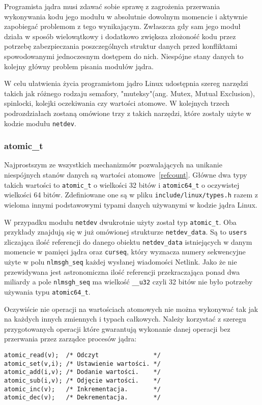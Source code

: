 \documentclass[10pt]{scrartcl}
\begin{document}
Programista jądra musi zdawać sobie sprawę z zagrożenia przerwania wykonywania kodu jego modułu w absolutnie dowolnym momencie i aktywnie zapobiegać problemom z tego wynikającym. Zwłaszcza gdy sam jego moduł działa w sposób wielowątkowy i dodatkowo zwiększa złożoność kodu przez potrzebę zabezpieczania poszczególnych struktur danych przed konfliktami spowodowanymi jednoczesnym dostępem do nich. Niespójne stany danych to kolejny główny problem pisania modułów jądra.

W celu ułatwienia życia programistom jądro Linux udostępnia szereg narzędzi takich jak różnego rodzaju semafory, "muteksy"(ang. Mutex, Mutual Exclusion), spinlocki, kolejki oczekiwania czy wartości atomowe. W kolejnych trzech podrozdziałach zostaną omówione trzy z takich narzędzi, które zostały użyte w kodzie modułu \texttt{netdev}.

\subsubsection{atomic\_t}

Najprostszym ze wszystkich mechanizmów pozwalających na unikanie niespójnych stanów danych są wartości atomowe~\ref{refcount}. Główne dwa typy takich wartości to \texttt{atomic\_t} o wielkości 32 bitów i \texttt{atomic64\_t} o oczywistej wielkości 64 bitów. Zdefiniowane one są w pliku \texttt{include/linux/types.h} razem z wieloma innymi podstawowymi typami danych używanymi w kodzie jądra Linux.

W przypadku modułu \texttt{netdev} dwukrotnie użyty został typ \texttt{atomic\_t}. Oba przykłady znajdują się w już omówionej strukturze \texttt{netdev\_data}. Są to \texttt{users} zliczająca ilość referencji do danego obiektu \texttt{netdev\_data} istniejących w danym momencie w pamięci jądra oraz \texttt{curseq}, który wyznacza numery sekwencyjne użyte w polu \texttt{nlmsgh\_seq} każdej wysłanej wiadomości Netlink. Jako że nie przewidywana jest astronomiczna ilość referencji przekraczająca ponad dwa miliardy a pole \texttt{nlmsgh\_seq} ma wielkość \texttt{\_\_u32} czyli 32 bitów nie było potrzeby używania typu \texttt{atomic64\_t}.

Oczywiście nie operacji na wartościach atomowych nie można wykonywać tak jak na każdych innych zmiennych i typach całkowych. Należy korzystać z szeregu przygotowanych operacji które gwarantują wykonanie danej operacji bez przerwania przez zarządce procesów jądra:

\begin{verbatim}
atomic_read(v);  /* Odczyt               */
atomic_set(v,i); /* Ustawienie wartości. */
atomic_add(i,v); /* Dodanie wartości.    */
atomic_sub(i,v); /* Odjęcie wartości.    */
atomic_inc(v);   /* Inkrementacja.       */
atomic_dec(v);   /* Dekrementacja.       */
\end{verbatim}
\end{document}
